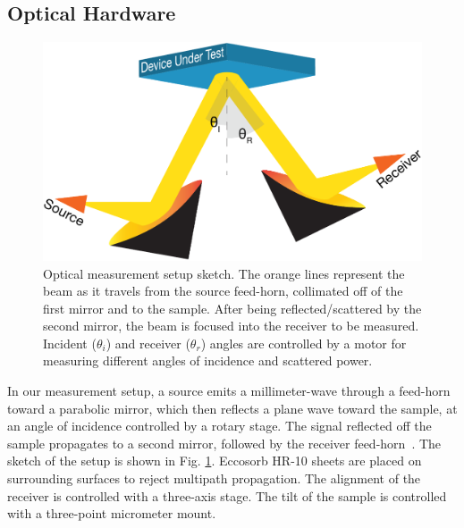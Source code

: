 \subsection{Optical Hardware}
\begin{figure}
    \centering
    \includegraphics[width = .7\textwidth]{Figures/refl_setup.pdf}
    \caption{Optical measurement setup sketch. The orange lines represent the beam as it travels from the source feed-horn, collimated off of the first mirror and to the sample. After being reflected/scattered by the second mirror, the beam is focused into the receiver to be measured. Incident ($\theta_i$) and receiver ($\theta_r$) angles are controlled by a motor for measuring different angles of incidence and scattered power.}
    \label{fig:optical_setup}
\end{figure}
In our measurement setup, a source emits a millimeter-wave through a feed-horn toward a parabolic mirror, which then reflects a plane wave toward the sample, at an angle of incidence controlled by a rotary stage. The signal reflected off the sample propagates to a second mirror, followed by the receiver feed-horn~\cite{ches18}. The sketch of the setup is shown in Fig. \ref{fig:optical_setup}. Eccosorb HR-10 sheets are placed on surrounding surfaces to reject multipath propagation. The alignment of the receiver is controlled with a three-axis stage. The tilt of the sample is controlled with a three-point micrometer mount.

